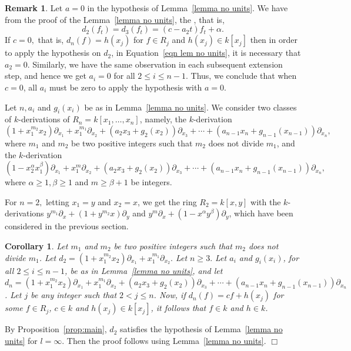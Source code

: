 \documentclass[12pt,reqno]{amsart}
\renewcommand{\leq}{\leqslant}
\renewcommand{\geq}{\geqslant}
\numberwithin{thm}{section}
\newtheorem{cor}[thm]{Corollary}
\theoremstyle{definition}
\newtheorem{rem}[thm]{Remark}
\numberwithin{equation}{thm}
\renewenvironment{proof}{\par\noindent {\em Proof:}}{\hfill$\Box$\medskip}
\theoremstyle{plain}
\begin{document}
\begin{rem}
    Let $a=0$ in the hypothesis of Lemma~\ref{lemma no units}. We have from the proof of the Lemma~\ref{lemma no units}, the , that is,  $$d_2(f_t)=d_{3}(f_t)=(c-a_2t)f_t+\alpha.$$ If $c=0,$ that is, $d_n(f)=h(x_j)$ for $f\in R_j$ and $h(x_j)\in k[x_j]$ then in order to apply the hypothesis on $d_2$, in Equation~\ref{eqn lem no units}, it is necessary that $a_2=0.$ Similarly, we have the same observation in each subsequent extension step, and hence we get $a_i=0$ for all $2\leq i\leq n-1$. Thus, we conclude that when $c=0$, all $a_i$ must be zero to apply the hypothesis with $a=0.$
\end{rem}

Let $n,a_i$ and $g_i(x_i)$ be as in Lemma~\ref{lemma no units}. We consider two classes of $k$-derivations of $R_n=k[x_1,\ldots,x_n]$, namely, the $k$-derivation $$(1 +x_1^{m_2}x_2)\partial_{x_1}+x_1^{m_1}\partial_{x_2}+(a_2 x_3 +g_2(x_2))\partial_{x_3}+\cdots+(a_{n-1}x_n + g_{n-1}(x_{n-1}))\partial_{x_n},$$ where $m_1$ and $m_2$ be two positive integers such that $m_2$ does not divide $m_1$, and the $k$-derivation $$(1-x_2^{\alpha} x_1^{\beta})\partial_{x_1} +x_1^m\partial_{x_2}+(a_2 x_3 +g_2(x_2))\partial_{x_3}+\cdots+(a_{n-1}x_n + g_{n-1}(x_{n-1}))\partial_{x_n},$$ where $\alpha\geq 1,\beta\geq 1$ and $m\geq \beta+1$ be integers. 

For $n=2,$ letting $x_1=y$ and $x_2=x$, we get the ring $R_2=k[x,y]$ with the $k$-derivations $y^{m_1}\partial_{x}+(1+y^{m_2}x)\partial_{y}$ and $y^m\partial_x+(1-x^{\alpha} y^{\beta})\partial_y$, which have been considered in the previous section.
\begin{cor}
    Let $m_1$ and $m_2$ be two positive integers such that $m_2$ does not divide $m_1$. Let $d_2=(1 +x_1^{m_2}x_2)\partial_{x_1}+x_1^{m_1}\partial_{x_2}.$ Let $n\geq 3.$ Let $a_i$ and $g_i(x_i)$, for all $2\leq i\leq n-1$, be as in Lemma~\ref{lemma no units}, and let $d_n=(1 +x_1^{m_2}x_2)\partial_{x_1}+x_1^{m_1}\partial_{x_2}+(a_2 x_3 +g_2(x_2))\partial_{x_3}+\cdots+(a_{n-1}x_n + g_{n-1}(x_{n-1}))\partial_{x_n}$. Let $j$ be any integer such that $2 <j \le n$. Now, if $d_n(f) = c f + h(x_j)$ for some $f\in R_j$, $c \in k$ and $h(x_j) \in k[x_j]$, it follows that $f \in k$ and $h \in k$. 
\end{cor}
\begin{proof}
    By Proposition~\ref{prop:main}, $d_2$ satisfies the hypothesis of Lemma~\ref{lemma no units} for $l=\infty$. Then the proof follows using Lemma~\ref{lemma no units}.
\end{proof}
\end{document}
